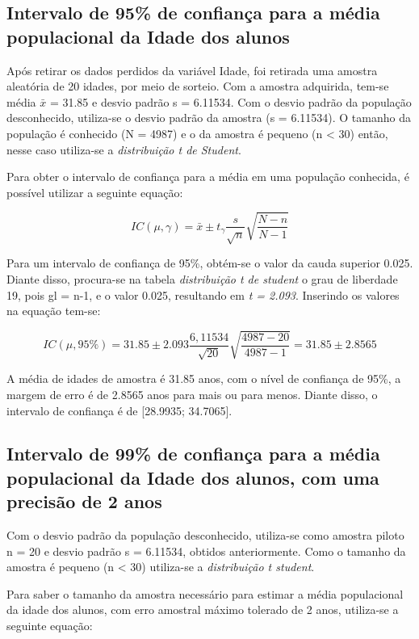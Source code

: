 \subsection{Intervalo de 95\% de confiança para a média populacional da Idade dos alunos}
\label{sub:1a}
Após retirar os dados perdidos da variável Idade, foi retirada uma amostra aleatória de 20 idades, por meio de sorteio. Com a amostra adquirida, tem-se média $\bar{x}$ = 31.85 e desvio padrão s 
= 6.11534. Com o desvio padrão da população desconhecido, utiliza-se o desvio padrão da amostra (s = 6.11534). O tamanho da população é conhecido (N = 4987) e o da amostra é pequeno (n < 30) então, 
nesse caso utiliza-se a \textit{distribuição t de Student}.

Para obter o intervalo de confiança para a média em uma população conhecida, é possível utilizar a seguinte equação:

\begin{equation*}
 IC (\mu, \gamma) = \bar{x} \pm t_\gamma \frac{s}{\sqrt{n}} \sqrt{\frac{N-n}{N-1}}
\end{equation*}

Para um intervalo de confiança de 95\%, obtém-se o valor da cauda superior 0.025. Diante disso, procura-se na tabela \textit{distribuição t de student} o grau de liberdade 19, pois gl = n-1, e o 
valor 0.025, resultando em \textit{t = 2.093}. Inserindo os valores na equação tem-se:

\begin{equation*}
 IC (\mu, 95\%) = 31.85 \pm 2.093 \frac{6,11534}{\sqrt{20}} \sqrt{\frac{4987 - 20}{4987 - 1}} 
                = 31.85 \pm 2.8565
\end{equation*}

A média de idades de amostra é 31.85 anos, com o nível de confiança de 95\%, a margem de erro é de 2.8565 anos para mais ou para menos. Diante disso, o intervalo de confiança é de [28.9935; 34.7065].

\subsection{Intervalo de 99\% de confiança para a média populacional da Idade dos alunos, com uma precisão de 2 anos}

Com o desvio padrão da população desconhecido, utiliza-se como amostra piloto n = 20 e desvio padrão s = 6.11534, obtidos anteriormente. Como o tamanho da amostra é pequeno (n < 30) utiliza-se a 
\textit{distribuição t student}.

Para saber o tamanho da amostra necessário para estimar a média populacional da idade dos alunos, com erro amostral máximo tolerado de 2 anos, utiliza-se a seguinte equação:


